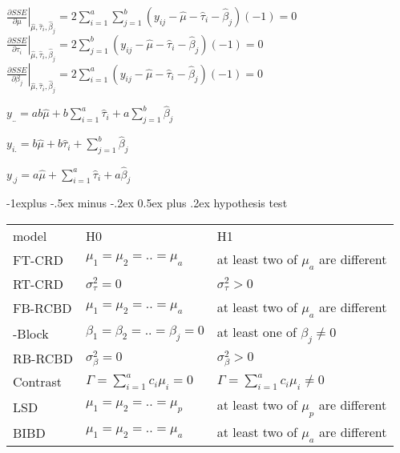 \documentclass[10pt,portrait]{article}
\makeatletter
\renewcommand{\subsection}{\@startsection{subsection}{2}{0mm}%
                                {-1explus -.5ex minus -.2ex}%
                                {0.5ex plus .2ex}%
                                {\normalfont\small\bfseries}}
\makeatother
\begin{document}
\begin{multicols}{2}
$\left.\frac{\partial SSE}{\partial\mu}\right|_{\hat\mu,\hat\tau_i,\hat\beta_j}=2\sum_{i=1}^a\sum_{j=1}^b(y_{ij}-\hat\mu-\hat\tau_i-\hat\beta_j)(-1)=0$    
$\left.\frac{\partial SSE}{\partial\tau_i}\right|_{\hat\mu,\hat\tau_i,\hat\beta_j}=2\sum_{j=1}^b(y_{ij}-\hat\mu-\hat\tau_i-\hat\beta_j)(-1)=0$  
$\left.\frac{\partial SSE}{\partial\beta_j}\right|_{\hat\mu,\hat\tau_i,\hat\beta_j}=2\sum_{i=1}^a(y_{ij}-\hat\mu-\hat\tau_i-\hat\beta_j)(-1)=0$  

$y_{..}=ab\hat\mu+b\sum_{i=1}^a\hat\tau_i+a\sum_{j=1}^b\hat\beta_j$

$y_{i.}=b\hat\mu+b\hat\tau_i+\sum_{j=1}^b\hat\beta_j$  

$y_{.j}=a\hat\mu+\sum_{i=1}^a\hat\tau_i+a\hat\beta_j$

\subsection{hypothesis test}
\begin{tabular}{ l|l|l }
model  &H0&H1\\
FT-CRD & $\mu_1=\mu_2=..=\mu_a$& at least two of $\mu_a$ are different\\
RT-CRD & $\sigma_{\tau}^2=0$& $\sigma_{\tau}^2>0$\\
FB-RCBD& $\mu_1=\mu_2=..=\mu_a$& at least two of $\mu_a$ are different\\
 -Block& $\beta_1=\beta_2=..=\beta_j=0$& at least one of $\beta_j\neq 0$\\
RB-RCBD& $\sigma_{\beta}^2=0$& $\sigma_{\beta}^2>0$\\
Contrast& $\Gamma=\sum_{i=1}^ac_i\mu_i=0$&$\Gamma=\sum_{i=1}^ac_i\mu_i\neq0$\\
LSD    & $\mu_1=\mu_2=..=\mu_p$& at least two of $\mu_p$ are different\\
BIBD   & $\mu_1=\mu_2=..=\mu_a$& at least two of $\mu_a$ are different\\
\end{tabular}


\end{multicols}
\end{document}
